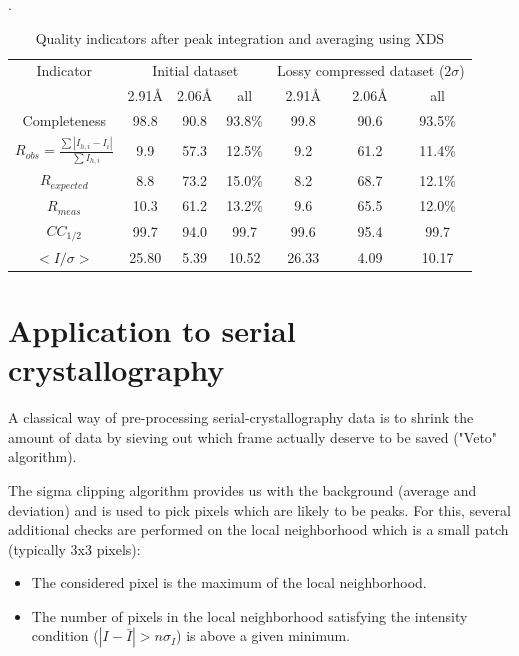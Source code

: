 \documentclass[preprint]{iucr}              %
\begin{document}
\begin{table}[1]
\begin{center}
\label{xds_summary}
\caption{Quality indicators after peak integration and averaging using XDS\cite{xds}}.
\begin{tabular}{|c|c c c|c c c|} 
\hline
Indicator & \multicolumn{3}{c|}{Initial dataset} & \multicolumn{3}{c|}{Lossy compressed dataset ($2\sigma$)} \\ 
          & 2.91\AA & 2.06\AA & all & 2.91\AA & 2.06\AA & all \\
\hline
Completeness                                        & 98.8& 90.8 & 93.8\% & 99.8& 90.6 & 93.5\% \\ 
$R_{obs}=\frac{\sum |I_{h,i}-I_{i}|}{\sum I_{h,i}}$ & 9.9 & 57.3& 12.5\% & 9.2 & 61.2&  11.4\%\\ 
$R_{expected}$                                      & 8.8 & 73.2& 15.0\% & 8.2 & 68.7 &  12.1\%\\
$R_{meas}$ \cite{Rmeas}  &10.3 &61.2& 13.2\% & 9.6 & 65.5 & 12.0\%\\
$CC_{1/2}$ \cite{cc1/2}  & 99.7 &94.0 & 99.7   & 99.6 & 95.4 & 99.7  \\
$<I/\sigma>$               & 25.80 & 5.39 & 10.52  & 26.33& 4.09 & 10.17 \\
\hline
\end{tabular}
\end{center}
\end{table}


\section{Application to serial crystallography}
A classical way of pre-processing serial-crystallography data is to shrink the amount of data by sieving out which frame actually deserve to be saved ("Veto" algorithm).

The sigma clipping algorithm provides us with the background (average and deviation) and is used to pick pixels which are likely to be peaks. 
For this,  several additional checks are performed on the local neighborhood which is a small patch (typically 3x3 pixels):
\begin{itemize}
\item The considered pixel is the maximum of the local neighborhood.
\item The number of pixels in the local neighborhood satisfying the intensity condition ($|I-\bar{I} |> n \sigma_{I}$)  is above a given minimum.
\end{itemize}
\end{document}
